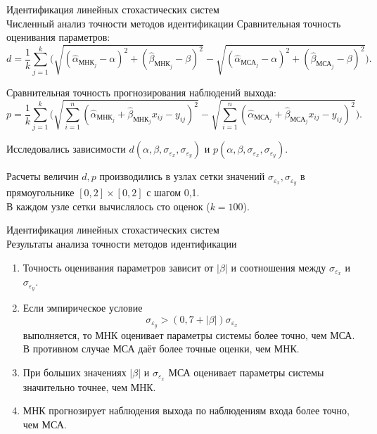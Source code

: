 \documentclass[hyperref={pdftex,unicode}]{beamer}
\begin{document}
\begin{frame}{%
    Идентификация линейных стохастических систем \\
    \small{Численный анализ точности методов идентификации}
  }
  Сравнительная точность оценивания параметров:
  \small{
    \begin{equation*}
      d =
      \frac{1}{k} \sum_{j=1}^k
      \Bigg(
      \sqrt{(\hat{\alpha}_{\text{МНК}_j} - \alpha)^2 + (\hat{\beta}_{\text{МНК}_j} - \beta)^2} -
      \sqrt{(\hat{\alpha}_{\text{МСА}_j} - \alpha)^2 + (\hat{\beta}_{\text{МСА}_j} - \beta)^2}
      \Bigg).
    \end{equation*}
  }

  Сравнительная точность прогнозирования наблюдений выхода:
  \small{
    \begin{equation*}
      p =
      \frac{1}{k} \sum_{j=1}^k
      \Bigg(
      \sqrt{ \sum_{i=1}^n (\hat{\alpha}_{\text{МНК}_j} + \hat{\beta}_{\text{МНК}_j} x_{ij} - y_{ij})^2} -
      \sqrt{ \sum_{i=1}^n (\hat{\alpha}_{\text{МСА}_j} + \hat{\beta}_{\text{МСА}_j} x_{ij} - y_{ij})^2}
      \Bigg).
    \end{equation*}
  }

  Исследовались зависимости
  \( d(\alpha, \beta, \sigma_{\varepsilon_x}, \sigma_{\varepsilon_y}) \) и
  \( p(\alpha, \beta, \sigma_{\varepsilon_x}, \sigma_{\varepsilon_y}) \).

\bigskip
\scriptsize{%
  Расчеты величин \( d, p \) производились в узлах сетки значений
  \( \sigma_{\varepsilon_x}, \sigma_{\varepsilon_y} \) в прямоугольнике
  \( [0, 2] \times [0, 2] \) с шагом 0{,}1. \\
  В каждом узле сетки вычислялось сто оценок (\( k = 100 \)).
}
\end{frame}

\begin{frame}{%
    Идентификация линейных стохастических систем \\
    \small{Результаты анализа точности методов идентификации}
  }
  \begin{enumerate}
  \item Точность оценивания параметров зависит от \( |\beta| \)
    и соотношения между \( \sigma_{\varepsilon_x} \) и \( \sigma_{\varepsilon_y} \). \\
  \item Если эмпирическое условие
    \begin{equation}
      \sigma_{\varepsilon_y} > (0{,}7 + |\beta|) \sigma_{\varepsilon_x}
      \label{eq:linear_condition}
    \end{equation}
    выполняется, то МНК оценивает параметры системы более точно, чем МСА.
    В противном случае МСА даёт более точные оценки, чем МНК.
    \item При больших значениях \( |\beta| \) и \( \sigma_{\varepsilon_x} \)
      МСА оценивает параметры системы значительно точнее, чем МНК.
  \item МНК прогнозирует наблюдения выхода по наблюдениям входа более точно, чем МСА.
  \end{enumerate}
\end{frame}
\end{document}
